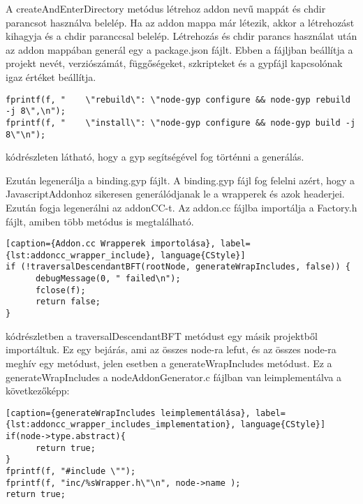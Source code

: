 A createAndEnterDirectory metódus létrehoz addon nevű mappát és chdir parancsot használva belelép.
Ha az addon mappa már létezik, akkor a létrehozást kihagyja és a chdir paranccsal belelép.
Létrehozás és chdir parancs használat után az addon mappában generál egy a package.json fájlt.
Ebben a fájljban beállítja a projekt nevét, verziószámát, függőségeket, szkripteket és a gypfájl kapcsolónak igaz értéket beállítja.

\begin{lstlisting}[caption={NodeAddonGenerator package.json szkriptek}, label={lst:nodeAddonGenerator_package_json}, language={CStyle}]
fprintf(f, "    \"rebuild\": \"node-gyp configure && node-gyp rebuild -j 8\",\n");
fprintf(f, "    \"install\": \"node-gyp configure && node-gyp build -j 8\"\n");
\end{lstlisting}

 kódrészleten látható, hogy a gyp segítségével fog történni a generálás.

\noindent

Ezután legenerálja a binding.gyp fájlt.
A binding.gyp fájl fog felelni azért, hogy a JavascriptAddonhoz sikeresen generálódjanak le a wrapperek és azok headerjei.
Ezután fogja legenerálni az addonCC-t.
Az addon.cc fájlba importálja a Factory.h fájlt, amiben több metódus is megtalálható.

\begin{lstlisting}[caption={Addon.cc Wrapperek importolása}, label={lst:addoncc_wrapper_include}, language{CStyle}]
if (!traversalDescendantBFT(rootNode, generateWrapIncludes, false)) {
      debugMessage(0, " failed\n");
      fclose(f);
      return false;
}
\end{lstlisting}

 kódrészletben a traversalDescendantBFT metódust egy másik projektből importáltuk.
Ez egy bejárás, ami az összes node-ra lefut, és az összes node-ra meghív egy metódust, jelen esetben a generateWrapIncludes metódust.
Ez a generateWrapIncludes a nodeAddonGenerator.c fájlban van leimplementálva a következőképp:

\begin{lstlisting}[caption={generateWrapIncludes leimplementálása}, label={lst:addoncc_wrapper_includes_implementation}, language{CStyle}]
if(node->type.abstract){
      return true;
}
fprintf(f, "#include \"");
fprintf(f, "inc/%sWrapper.h\"\n", node->name );
return true;
\end{lstlisting}

